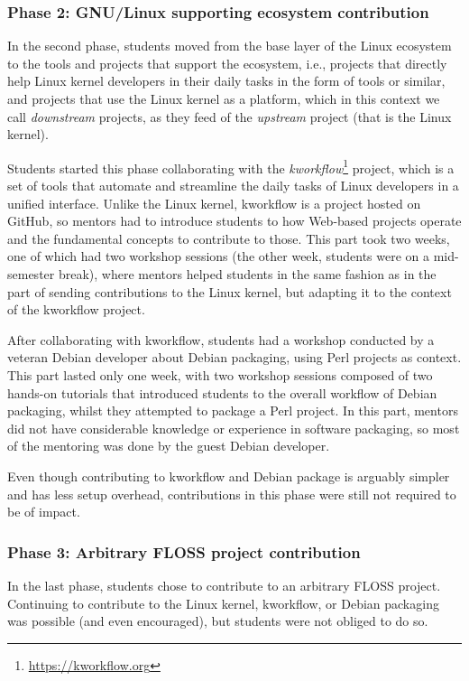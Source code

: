 \subsubsection{\textbf{Phase 2:} GNU/Linux supporting ecosystem contribution}

In the second phase, students moved from the base layer of the Linux ecosystem
to the tools and projects that support the ecosystem, i.e., projects that
directly help Linux kernel developers in their daily tasks in the form of tools
or similar, and projects that use the Linux kernel as a platform, which in this
context we call \textit{downstream} projects, as they feed of the
\textit{upstream} project (that is the Linux kernel).

Students started this phase collaborating with the
\textit{kworkflow}\footnote{\href{https://kworkflow.org}{https://kworkflow.org}}
project, which is a set of tools that automate and streamline the daily tasks of
Linux developers in a unified interface. Unlike the Linux kernel, kworkflow is a
project hosted on GitHub, so mentors had to introduce students to how Web-based
projects operate and the fundamental concepts to contribute to those. This part
took two weeks, one of which had two workshop sessions (the other week, students
were on a mid-semester break), where mentors helped students in the same fashion
as in the part of sending contributions to the Linux kernel, but adapting it to
the context of the kworkflow project.

After collaborating with kworkflow, students had a workshop conducted by a
veteran Debian developer about Debian packaging, using Perl projects as context.
This part lasted only one week, with two workshop sessions composed of two
hands-on tutorials that introduced students to the overall workflow of Debian
packaging, whilst they attempted to package a Perl project. In this part,
mentors did not have considerable knowledge or experience in software packaging,
so most of the mentoring was done by the guest Debian developer.

Even though contributing to kworkflow and Debian package is arguably simpler and
has less setup overhead, contributions in this phase were still not required to
be of impact.

\subsubsection{\textbf{Phase 3:} Arbitrary FLOSS project contribution}

In the last phase, students chose to contribute to an arbitrary FLOSS project.
Continuing to contribute to the Linux kernel, kworkflow, or Debian packaging was
possible (and even encouraged), but students were not obliged to do so.

